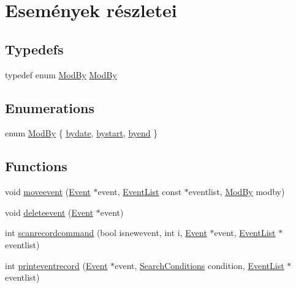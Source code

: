 \hypertarget{group__eventrecord}{}\section{Események részletei}
\label{group__eventrecord}
\subsection*{Typedefs}
\begin{DoxyCompactItemize}
\item 
typedef enum \hyperlink{group__eventrecord_ga643f8b09cbc45afc4ad36b27c077b1fd}{Mod\+By} \hyperlink{group__eventrecord_ga362ee478a7a01737cf42d32360eda02e}{Mod\+By}
\end{DoxyCompactItemize}
\subsection*{Enumerations}
\begin{DoxyCompactItemize}
\item 
enum \hyperlink{group__eventrecord_ga643f8b09cbc45afc4ad36b27c077b1fd}{Mod\+By} \{ \hyperlink{group__eventrecord_gga643f8b09cbc45afc4ad36b27c077b1fdaa9de7918fcb113fa90f19d4b2d4d9145}{bydate}, 
\hyperlink{group__eventrecord_gga643f8b09cbc45afc4ad36b27c077b1fdafdfbfec88cf0d73c65e444460a06ea52}{bystart}, 
\hyperlink{group__eventrecord_gga643f8b09cbc45afc4ad36b27c077b1fdabf00156964562a454e20d189035c3cb3}{byend}
 \}
\end{DoxyCompactItemize}
\subsection*{Functions}
\begin{DoxyCompactItemize}
\item 
void \hyperlink{group__eventrecord_ga610dc34a1e251a16311ca7ac15f64e05}{moveevent} (\hyperlink{struct_event}{Event} $\ast$event, \hyperlink{struct_event_list}{Event\+List} const $\ast$eventlist, \hyperlink{group__eventrecord_ga643f8b09cbc45afc4ad36b27c077b1fd}{Mod\+By} modby)
\item 
void \hyperlink{group__eventrecord_gaf69a5ee77b139263897d5e6bfe7d7f2a}{deleteevent} (\hyperlink{struct_event}{Event} $\ast$event)
\item 
int \hyperlink{group__eventrecord_ga9b64fb7501bab380e6146ef4a4f558c7}{scanrecordcommand} (bool isnewevent, int i, \hyperlink{struct_event}{Event} $\ast$event, \hyperlink{struct_event_list}{Event\+List} $\ast$eventlist)
\item 
int \hyperlink{group__eventrecord_ga43a7dc247171d596d8d808776d8d40f5}{printeventrecord} (\hyperlink{struct_event}{Event} $\ast$event, \hyperlink{struct_search_conditions}{Search\+Conditions} condition, \hyperlink{struct_event_list}{Event\+List} $\ast$eventlist)
\end{DoxyCompactItemize}


